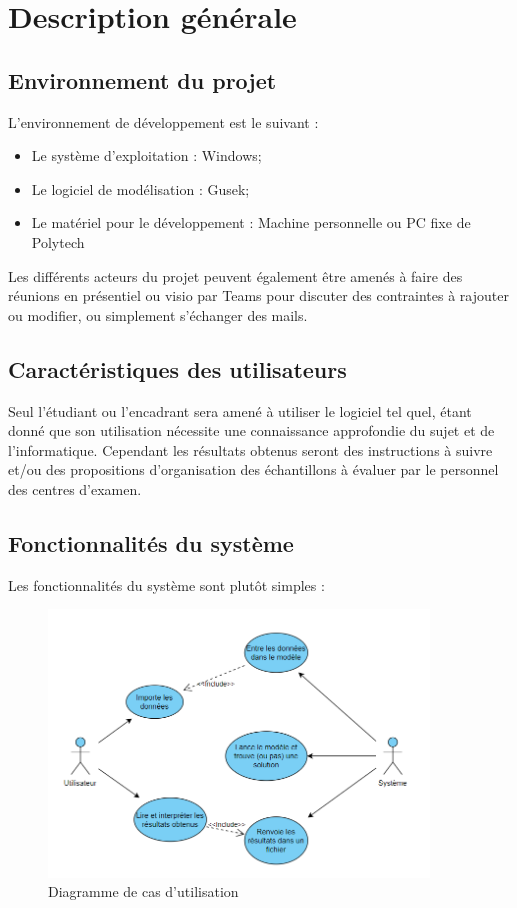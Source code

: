 \documentclass{polytech/polytech}
\numberwithin{figure}{chapter}
\begin{document}
\chapter{Description générale}
\section{Environnement du projet}

L’environnement de développement est le suivant :
\begin{itemize}
    \item Le système d’exploitation : Windows;
    \item Le logiciel de modélisation : Gusek;
    \item Le matériel pour le développement : Machine personnelle ou PC fixe de Polytech\\
\end{itemize}

Les différents acteurs du projet peuvent également être amenés à faire des réunions en présentiel ou visio par Teams pour discuter des contraintes à rajouter ou modifier, ou simplement s'échanger des mails.


\section{Caractéristiques des utilisateurs}

Seul l'étudiant ou l'encadrant sera amené à utiliser le logiciel tel quel, étant donné que son utilisation nécessite une connaissance approfondie du sujet et de l'informatique. Cependant les résultats obtenus seront des instructions à suivre et/ou des propositions d'organisation des échantillons à évaluer par le personnel des centres d'examen.
\pagebreak

\section{Fonctionnalités du système}
Les fonctionnalités du système sont plutôt simples : \\

\begin{figure}[h]
    \centering
    \includegraphics[width=0.9\textwidth]{pic/usecase.png}
    \caption{Diagramme de cas d'utilisation}
    \label{fig:use_case1}
\end{figure}
\end{document}
